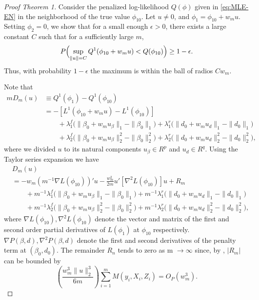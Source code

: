 \begin{proof}[Proof Theorem 1]
	Consider the penalized log-likelihood $Q(\phi)$ given in \eqref{eq:MLE-EN} in the neighborhood of the true value $ \phi_{10} $. Let $u\ne 0$, and $\phi_1=\phi_{10}+w_mu$. Setting $\phi_2=0$, we show that for a small enough $\epsilon>0$, there exists a large constant $C$ such that for a sufficiently large $m$,
	\begin{equation*}
	P\Bigl(  \sup_{\|u\|=C}Q^1(
	\phi_{10}+w_mu)  <
	Q(\phi_{10})
	\Bigr) \ge 1-\epsilon.
	\end{equation*}
Thus, with probability $1-\epsilon$ the maximum is within the ball of radios $Cw_m$.

Note that\begin{align*}
mD_m(u)&\equiv    Q^1(\phi_1)-Q^1(\phi_{10})
\\
&=-\left[ L^1(\phi_{10}+w_mu)-L^1(\phi_{10})\right]
\\
&\hspace{2em} +\lambda_1^f\bigl(\|\beta_0+w_m u_\beta\|_1-\|\beta_0\|_1\bigr) +\lambda_1^r\bigl(\|d_0+w_m u_d\|_1-\|d_0\|_1\bigr)
\\
&\hspace{2em} +\lambda_2^f\bigl(\|\beta_0+w_m u_\beta\|_2^2-\|\beta_0\|_2^2\bigr) +\lambda_2^r\bigl(\|d_0+w_m u_d\|_2^2-\|d_0\|_2^2\bigr),
\end{align*}
where we divided $u$ to its  natural components $u_\beta\in R^p$ and $u_d\in R^q$.  Using the Taylor series expansion we have
\begin{align*}
&D_m(u)
\\
&=-w_m(m^{-1}\nabla L(\phi_{10}))'u -\frac{w_m^2}{2m}u'[\nabla^2L(\phi_{10})]u +R_m
\\
&\hspace{2em} +m^{-1}\lambda_1^f\bigl(\|\beta_0+w_m u_\beta\|_1-\|\beta_0\|_1\bigr) +m^{-1}\lambda_1^r\bigl(\|d_0+w_m u_d\|_1-\|d_0\|_1\bigr)
\\
&\hspace{2em} +m^{-1}\lambda_2^f\bigl(\|\beta_0+w_m u_\beta\|_2^2-\|\beta_0\|_2^2\bigr) +m^{-1}\lambda_2^r\bigl(\|d_0+w_m u_d\|_2^2-\|d_0\|_2^2\bigr),
\end{align*}
%
where $\nabla L(\phi_{10}),\nabla^2 L(\phi_{10})$ denote the vector and matrix of the first and second order partial derivatives of $L(\phi_{1})$  at $\phi_{10}$ respectively. $\nabla P(\beta,d),\nabla^2P(\beta,d)$ denote the first and second derivatives of the penalty term at $(\beta_0,d_0)$. The remainder $R_n$  tends to zero as m $\rightarrow \infty$ since, by , $|R_m|$ can be bounded by
$$\left( \frac{w_m^3\|u\|_2^3}{6m}\right) \sum\limits_{i=1}^{m} M(y_i,X_i,Z_i) = O_P( w_m^{3}).$$



\end{proof}
